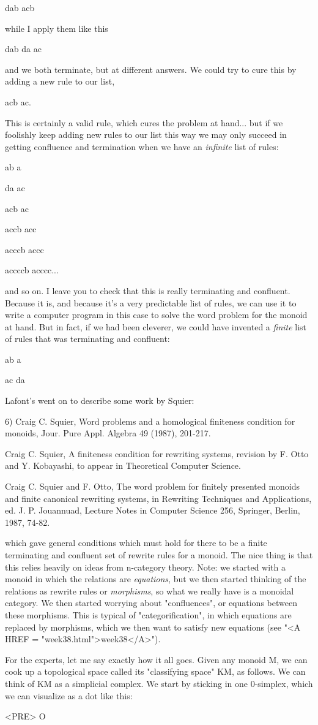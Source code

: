 dab \to  acb 

while I apply them like this

dab \to  da \to  ac

and we both terminate, but at different answers.  We could try to cure
this by adding a new rule to our list, 

acb \to  ac.

This is certainly a valid rule, which cures the problem at hand...
but if we foolishly keep adding new rules to our list this way we may
only succeed in getting confluence and termination when we have an
\emph{infinite} list of rules: 

ab \to  a 

da \to  ac 

acb \to  ac 

accb \to  acc 

acccb \to  accc 

accccb \to  acccc... 


and so on.  I leave you to check that this is really terminating and
confluent.  Because it is, and because it's a very predictable list of
rules, we can use it to write a computer program in this case to solve
the word problem for the monoid at hand.  But in fact, if we had been
cleverer, we could have invented a \emph{finite} list of rules that was
terminating and confluent:

ab \to  a 

ac \to  da

Lafont's went on to describe some work by Squier:

6) Craig C. Squier, Word problems and a homological finiteness condition
for monoids, Jour. Pure Appl. Algebra 49 (1987), 201-217.

Craig C. Squier, A finiteness condition for rewriting systems, revision by F.
Otto and Y. Kobayashi, to appear in Theoretical Computer Science.

Craig C. Squier and F. Otto, The word problem for finitely presented
monoids and finite canonical rewriting systems, in Rewriting Techniques 
and Applications, ed. J. P. Jouannuad, Lecture Notes in Computer Science 
256, Springer, Berlin, 1987, 74-82.

which gave general conditions which must hold for there to be a finite
terminating and confluent set of rewrite rules for a monoid.  The nice
thing is that this relies heavily on ideas from n-category theory.
Note: we started with a monoid in which the relations are \emph{equations},
but we then started thinking of the relations as rewrite rules or
\emph{morphisms}, so what we really have is a monoidal category.  We then
started worrying about "confluences", or equations between these
morphisms.  This is typical of "categorification", in which equations
are replaced by morphisms, which we then want to satisfy new equations
(see "<A HREF = "week38.html">week38</A>").

For the experts, let me say exactly how it all goes.  Given any monoid M,
we can cook up a topological space called its "classifying space" KM,
as follows. We can think of KM as a simplicial complex.  We start by
sticking in one 0-simplex, which we can visualize as a dot like this:


<PRE>
O


